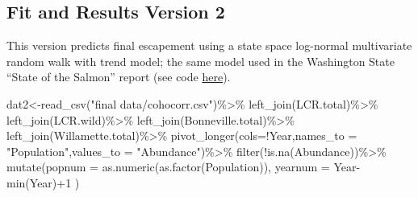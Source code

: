 \documentclass[
]{article}
\newenvironment{Shaded}{\begin{snugshade}}{\end{snugshade}}
\newcommand{\AttributeTok}[1]{\textcolor[rgb]{0.77,0.63,0.00}{#1}}
\newcommand{\DecValTok}[1]{\textcolor[rgb]{0.00,0.00,0.81}{#1}}
\newcommand{\FunctionTok}[1]{\textcolor[rgb]{0.00,0.00,0.00}{#1}}
\newcommand{\NormalTok}[1]{#1}
\newcommand{\OtherTok}[1]{\textcolor[rgb]{0.56,0.35,0.01}{#1}}
\newcommand{\SpecialCharTok}[1]{\textcolor[rgb]{0.00,0.00,0.00}{#1}}
\newcommand{\StringTok}[1]{\textcolor[rgb]{0.31,0.60,0.02}{#1}}
\begin{document}
\hypertarget{fit-and-results-version-2}{%
\subsection{Fit and Results Version 2}\label{fit-and-results-version-2}}

This version predicts final escapement using a state space log-normal
multivariate random walk with trend model; the same model used in the
Washington State ``State of the Salmon'' report (see code
\href{https://github.com/tbuehrens/WDFW_SOS_Analysis}{here}).

\begin{Shaded}
\begin{Highlighting}[]
\NormalTok{dat2}\OtherTok{\textless{}{-}}\FunctionTok{read\_csv}\NormalTok{(}\StringTok{"final data/cohocorr.csv"}\NormalTok{)}\SpecialCharTok{\%\textgreater{}\%}
  \FunctionTok{left\_join}\NormalTok{(LCR.total)}\SpecialCharTok{\%\textgreater{}\%}
  \FunctionTok{left\_join}\NormalTok{(LCR.wild)}\SpecialCharTok{\%\textgreater{}\%}
  \FunctionTok{left\_join}\NormalTok{(Bonneville.total)}\SpecialCharTok{\%\textgreater{}\%}
  \FunctionTok{left\_join}\NormalTok{(Willamette.total)}\SpecialCharTok{\%\textgreater{}\%}
  \FunctionTok{pivot\_longer}\NormalTok{(}\AttributeTok{cols=}\SpecialCharTok{!}\NormalTok{Year,}\AttributeTok{names\_to =} \StringTok{"Population"}\NormalTok{,}\AttributeTok{values\_to =} \StringTok{"Abundance"}\NormalTok{)}\SpecialCharTok{\%\textgreater{}\%}
  \FunctionTok{filter}\NormalTok{(}\SpecialCharTok{!}\FunctionTok{is.na}\NormalTok{(Abundance))}\SpecialCharTok{\%\textgreater{}\%}
  \FunctionTok{mutate}\NormalTok{(}\AttributeTok{popnum =} \FunctionTok{as.numeric}\NormalTok{(}\FunctionTok{as.factor}\NormalTok{(Population)),}
         \AttributeTok{yearnum =}\NormalTok{ Year}\SpecialCharTok{{-}}\FunctionTok{min}\NormalTok{(Year)}\SpecialCharTok{+}\DecValTok{1}
\NormalTok{         )}



\end{Highlighting}
\end{Shaded}
\end{document}
